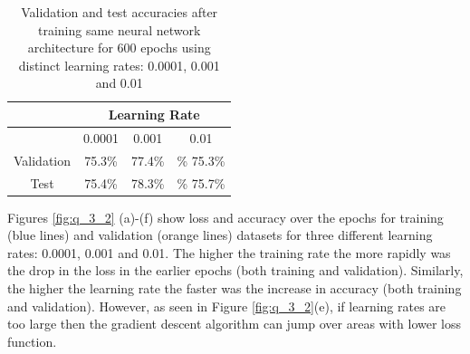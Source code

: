 \documentclass[11pt]{article}
\begin{document}
\begin{table}[!h]
\centering
\caption{Validation and test accuracies after training same neural network architecture for 600 epochs using distinct learning rates: 0.0001, 0.001 and 0.01}
\label{tab:acc_comparison}
    \begin{tabular}{|c|ccc|}
    \hline
               & \multicolumn{3}{c|}{Learning Rate}                                  \\ \hline
               & \multicolumn{1}{c|}{0.0001} & \multicolumn{1}{c|}{0.001} & 0.01  \\ \hline
    Validation & \multicolumn{1}{c|}{75.3\%}  & \multicolumn{1}{c|}{77.4\%} & \% 75.3\%\\ \hline
    Test       & \multicolumn{1}{c|}{75.4\%}  & \multicolumn{1}{c|}{78.3\%} & \% 75.7\%\\ \hline
    \end{tabular}
\end{table}


Figures \ref{fig:q_3_2} (a)-(f) show loss and accuracy over the epochs for training (blue lines) and validation (orange lines) datasets for three different 
learning rates: 0.0001, 0.001 and 0.01. The higher the training rate the more rapidly was the drop in the loss in the earlier epochs (both training and validation). Similarly, 
the higher the learning rate the faster was the increase in accuracy (both training and validation). However, as seen in Figure \ref{fig:q_3_2}(e), if  learning rates are too large then the 
gradient descent algorithm can jump over areas with lower loss function. 
\end{document}
